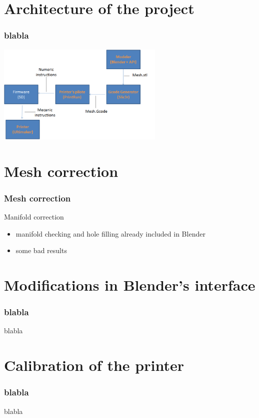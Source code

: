 \documentclass{beamer}
\begin{document}
\section{Architecture of the project}
\begin{frame}
	\frametitle{blabla}

    \begin{center}
		\includegraphics[width=8cm]{ARD1}	
	\end{center}
	
\end{frame}

\section{Mesh correction}
\begin{frame}
	\frametitle{Mesh correction}

    \begin{block}{Manifold correction}
		\begin{itemize}
			\item manifold checking and hole filling already included in Blender
			\item some bad results
		\end{itemize}
    \end{block}
\end{frame}

\section{Modifications in Blender's interface}
\begin{frame}
	\frametitle{blabla}

    \begin{block}{blabla}
    \end{block}
\end{frame}

\section{Calibration of the printer}
\begin{frame}
	\frametitle{blabla}

    \begin{block}{blabla}
    \end{block}
\end{frame}
\end{document}
